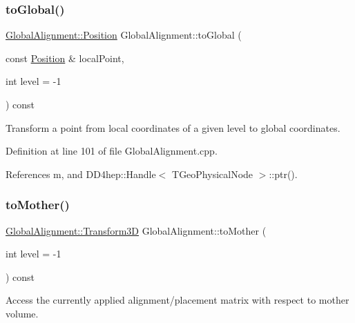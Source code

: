 \subsubsection{\texorpdfstring{to\+Global()}{toGlobal()}\hspace{0.1cm}{\footnotesize\ttfamily [2/2]}}
{\footnotesize\ttfamily \hyperlink{class_d_d4hep_1_1_alignments_1_1_global_alignment_a9cd5167ec3a33a95ca76a9c7fe06271e}{Global\+Alignment\+::\+Position} Global\+Alignment\+::to\+Global (\begin{DoxyParamCaption}\item[{const \hyperlink{class_d_d4hep_1_1_alignments_1_1_global_alignment_a9cd5167ec3a33a95ca76a9c7fe06271e}{Position} \&}]{local\+Point,  }\item[{int}]{level = {\ttfamily -\/1} }\end{DoxyParamCaption}) const}



Transform a point from local coordinates of a given level to global coordinates. 



Definition at line 101 of file Global\+Alignment.\+cpp.



References m, and D\+D4hep\+::\+Handle$<$ T\+Geo\+Physical\+Node $>$\+::ptr().

\hypertarget{class_d_d4hep_1_1_alignments_1_1_global_alignment_af4439ae3b62095d9388fc32023e00a95}{}\label{class_d_d4hep_1_1_alignments_1_1_global_alignment_af4439ae3b62095d9388fc32023e00a95} 
\subsubsection{\texorpdfstring{to\+Mother()}{toMother()}}
{\footnotesize\ttfamily \hyperlink{class_d_d4hep_1_1_alignments_1_1_global_alignment_a328240cbc53ba92424336a5898ba49d3}{Global\+Alignment\+::\+Transform3D} Global\+Alignment\+::to\+Mother (\begin{DoxyParamCaption}\item[{int}]{level = {\ttfamily -\/1} }\end{DoxyParamCaption}) const}



Access the currently applied alignment/placement matrix with respect to mother volume. 

